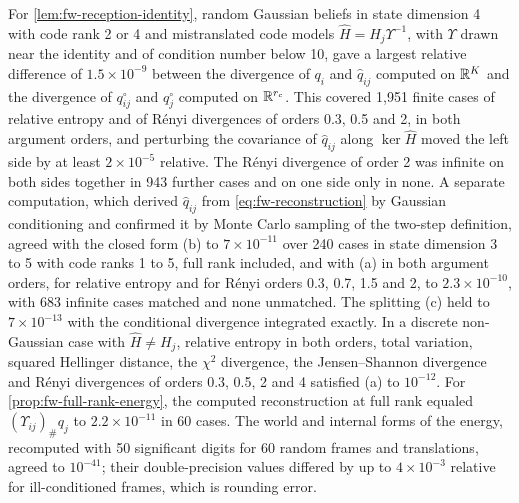 \begin{numcheck}\label{chk:fw-comm-energy}
For \cref{lem:fw-reception-identity}, random Gaussian beliefs in state dimension 4 with code rank 2 or 4 and mistranslated code models $\hat H=H_j\Upsilon^{-1}$, with $\Upsilon$ drawn near the identity and of condition number below 10, gave a largest relative difference of $1.5\times10^{-9}$ between the divergence of $q_i$ and $\hat q_{ij}$ computed on $\mathbb{R}^K$ and the divergence of $q^\circ_{ij}$ and $q^\circ_j$ computed on $\mathbb{R}^{r_c}$. This covered 1,951 finite cases of relative entropy and of R\'enyi divergences of orders 0.3, 0.5 and 2, in both argument orders, and perturbing the covariance of $\hat q_{ij}$ along $\ker\hat H$ moved the left side by at least $2\times10^{-5}$ relative. The R\'enyi divergence of order 2 was infinite on both sides together in 943 further cases and on one side only in none. A separate computation, which derived $\hat q_{ij}$ from \eqref{eq:fw-reconstruction} by Gaussian conditioning and confirmed it by Monte Carlo sampling of the two-step definition, agreed with the closed form (b) to $7\times10^{-11}$ over 240 cases in state dimension 3 to 5 with code ranks 1 to 5, full rank included, and with (a) in both argument orders, for relative entropy and for R\'enyi orders 0.3, 0.7, 1.5 and 2, to $2.3\times10^{-10}$, with 683 infinite cases matched and none unmatched. The splitting (c) held to $7\times10^{-13}$ with the conditional divergence integrated exactly. In a discrete non-Gaussian case with $\hat H\ne H_j$, relative entropy in both orders, total variation, squared Hellinger distance, the $\chi^2$ divergence, the Jensen--Shannon divergence and R\'enyi divergences of orders 0.3, 0.5, 2 and 4 satisfied (a) to $10^{-12}$. For \cref{prop:fw-full-rank-energy}, the computed reconstruction at full rank equaled $(\Upsilon_{ij})_\#q_j$ to $2.2\times10^{-11}$ in 60 cases. The world and internal forms of the energy, recomputed with 50 significant digits for 60 random frames and translations, agreed to $10^{-41}$; their double-precision values differed by up to $4\times10^{-3}$ relative for ill-conditioned frames, which is rounding error.
\end{numcheck}

